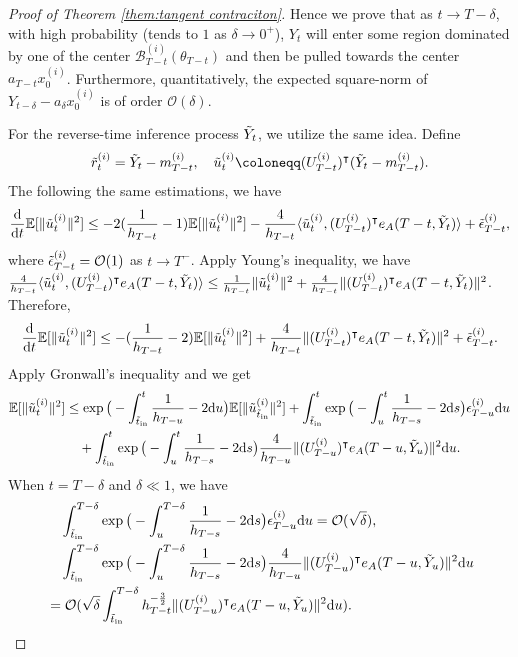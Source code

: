 \documentclass[11pt]{article}
\newcommand{\mb}{\mathbb}
\newcommand{\dee}{\mathrm{d}}
\newcommand{\mc}{\mathcal}
\begin{document}
\begin{proof}[Proof of Theorem \ref{them:tangent contraciton}]
Hence we prove that as $t\to T-\delta$, with high probability (tends to $1$ as $\delta\to 0^+$), $Y_t$ will enter some region dominated by one of the center $\mc{B}_{T-t}^{(i)}(\theta_{T-t})$ and then be pulled towards the center $a_{T-t}x_0^{(i)}$. Furthermore, quantitatively, the expected square-norm of $Y_{t-\delta}-a_{\delta}x_0^{(i)}$ is of order $\mc{O}(\delta)$.   

For the reverse-time inference process $\Tilde{Y}_t$, we utilize the same idea. Define 
\begin{align*}
    \Tilde{r}_t^{(i)} = \Tilde{Y}_t-m_{T-t}^{(i)},\quad \Tilde{u}_t^{(i)} \coloneqq (U_{T-t}^{(i)})^\intercal  (\Tilde{Y}_t-m_{T-t}^{(i)}) .
\end{align*}
The following the same estimations, we have
\begin{align*}
    \frac{\dee}{\dee t} \mb{E}[\| \Tilde{u}_t^{(i)} \|^2]  \le -2(\frac{1}{h_{T-t}}-1)\mb{E}[\| \Tilde{u}_t^{(i)} \|^2] - \frac{4}{h_{T-t}}\langle \Tilde{u}_t^{(i)}, (U_{T-t}^{(i)})^\intercal e_A(T-t,\Tilde{Y}_t) \rangle + \Tilde{\epsilon}_{T-t}^{(i)}, 
\end{align*}
where $\Tilde{\epsilon}_{T-t}^{(i)}=\mc{O}(1)$ as $t\to T^-$. Apply Young's inequality, we have $\tfrac{4}{h_{T-t}}\langle \Tilde{u}_t^{(i)}, (U_{T-t}^{(i)})^\intercal e_A(T-t,\Tilde{Y}_t) \rangle\le \tfrac{1}{h_{T-t}}\| \Tilde{u}_t^{(i)} \|^2 + \tfrac{4}{h_{T-t}}\|(U_{T-t}^{(i)})^\intercal e_A(T-t,\Tilde{Y}_t) \|^2$. Therefore,
\begin{align*}
     \frac{\dee}{\dee t} \mb{E}[\| \Tilde{u}_t^{(i)} \|^2]  \le -(\frac{1}{h_{T-t}}-2)\mb{E}[\| \Tilde{u}_t^{(i)} \|^2] + \frac{4}{h_{T-t}}\|(U_{T-t}^{(i)})^\intercal e_A(T-t,\Tilde{Y}_t) \|^2 + \Tilde{\epsilon}_{T-t}^{(i)}.
\end{align*}
Apply Gronwall's inequality and we get
\begin{align*}
    \mb{E}[\| \Tilde{u}_t^{(i)} \|^2]  &
    \le \exp\big( -\int_{\Tilde{t}_{\mathrm{in}}}^t \frac{1}{h_{T-u}}-2 \dee u\big) \mb{E}[\| \Tilde{u}_{\Tilde{t}_{\mathrm{in}}}^{(i)} \|^2] + \int_{\Tilde{t}_{\mathrm{in}}}^t \exp\big( -\int_u^t \frac{1}{h_{T-s}}-2 \dee s\big) \epsilon_{T-u}^{(i)}\dee u\\
    &\quad + \int_{\Tilde{t}_{\mathrm{in}}}^t \exp\big( -\int_u^t \frac{1}{h_{T-s}}-2 \dee s\big) \frac{4}{h_{T-u}}\|(U_{T-u}^{(i)})^\intercal e_A(T-u,\Tilde{Y}_u) \|^2\dee u.
\end{align*}
When $t=T-\delta$ and $\delta\ll 1$, we have
\begin{align*}
    &\quad \int_{\Tilde{t}_{\mathrm{in}}}^{T-\delta} \exp\big( -\int_u^{T-\delta} \frac{1}{h_{T-s}}-2 \dee s\big) \epsilon_{T-u}^{(i)}\dee u =\mc{O}( \sqrt{\delta} ) , \\
    &\quad\int_{\Tilde{t}_{\mathrm{in}}}^{T-\delta} \exp\big( -\int_u^{T-\delta} \frac{1}{h_{T-s}}-2 \dee s\big) \frac{4}{h_{T-u}}\|(U_{T-u}^{(i)})^\intercal e_A(T-u,\Tilde{Y}_u) \|^2\dee u\\
    &= \mc{O}(\sqrt{\delta}\int_{\Tilde{t}_{\mathrm{in}}}^{T-\delta}  h_{T-t}^{-\frac{3}{2}}\|(U_{T-u}^{(i)})^\intercal e_A(T-u,\Tilde{Y}_u) \|^2\dee u).
\end{align*}
\end{proof}
\end{document}
